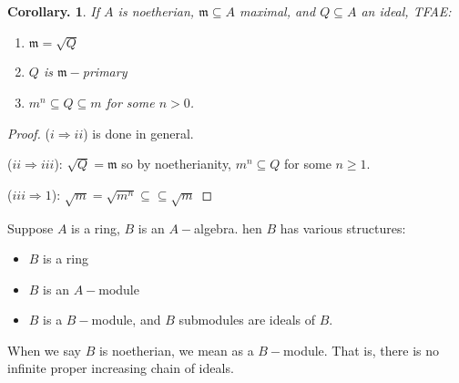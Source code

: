 \documentclass[11pt, a4paper]{memoir}
\newcommand{\imp}[2]{($#1\Rightarrow#2$)\hspace{0.2cm}}
\theoremstyle{change}
\newtheorem{corollary}[theorem]{Corollary.}
\theoremstyle{plain}
\theoremstyle{nonumberplain}
\newtheorem{proof}{Proof}
\numberwithin{equation}{section}
\begin{document}
\begin{corollary}
    If $A$ is noetherian, $\mathfrak{m}\subseteq A$ maximal, and $Q\subseteq A$ an ideal, TFAE:
    \begin{enumerate}[nl,r]
        \item $\mathfrak{m}=\sqrt{Q}$
        \item $Q$ is $\mathfrak{m}-$primary
        \item $m^n\subseteq Q\subseteq m$ for some $n>0$.
    \end{enumerate}
\end{corollary}
\begin{proof}
    \imp{i}{ii} is done in general.

    \imp{ii}{iii}: $\sqrt{Q}=\mathfrak{m}$ so by noetherianity, $m^n\subseteq Q$ for some $n\geq 1$.

    \imp{iii}{1}: $\sqrt{m}=\sqrt{m^n}\subseteq\subseteq\sqrt{m}$
\end{proof}
Suppose $A$ is a ring, $B$ is an $A-$algebra.
hen $B$ has various structures:
\begin{itemize}[nl]
    \item $B$ is a ring
    \item $B$ is an $A-$module
    \item $B$ is a $B-$module, and $B$ submodules are ideals of $B$.
\end{itemize}
When we say $B$ is noetherian, we mean as a $B-$module.
That is, there is no infinite proper increasing chain of ideals.
\end{document}
